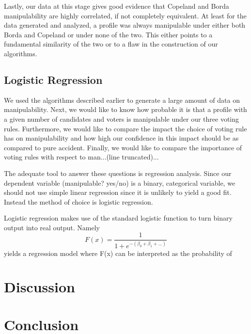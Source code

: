 \documentclass[10pt,a4paper]{article}
\begin{document}
Lastly, our data at this stage gives good evidence that Copeland and Borda manipulability are highly correlated, if not completely equivalent. At least for the data generated and analyzed, a profile was always manipulable under either both Borda and Copeland or under none of the two. This either points to a fundamental similarity of the two or to a flaw in the construction of our algorithms.
\subsection{Logistic Regression}
We used the algorithms described earlier to generate a large amount of data on manipulability. Next, we would like to know how probable it is that a profile with a given number of candidates and voters is manipulable under our three voting rules. Furthermore, we would like to compare the impact the choice of voting rule has on manipulability and how high our confidence in this impact should be as compared to pure accident. Finally, we would like to compare the importance of voting rules with respect to man...(line truncated)...

The adequate tool to answer these questions is regression analysis. Since our dependent variable (manipulable? yes/no) is a binary, categorical variable, we should not use simple linear regression since it is unlikely to yield a good fit. Instead the method of choice is logistic regression.

Logistic regression makes use of the standard logistic function to turn binary output into real output. Namely \[F(x)=\frac{1}{1+e^{-(\beta_0+\beta_1+...)}}\] yields a regression model where F(x) can be interpreted as the probability of
\section{Discussion}
\section{Conclusion}
\end{document}

